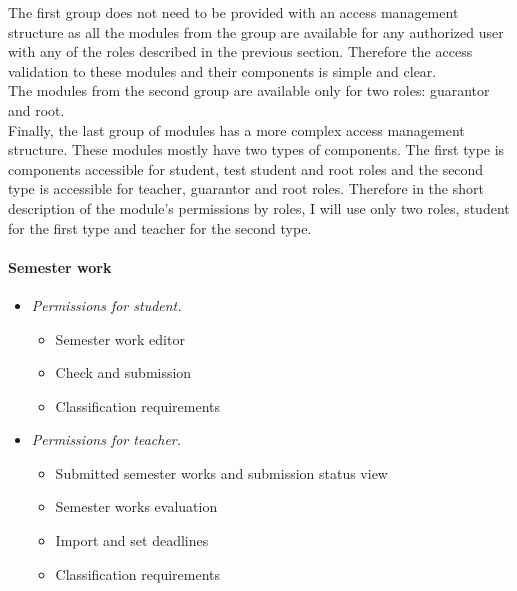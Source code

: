 \noindent The first group does not need to be provided with an access management structure as all the modules from the group are available for any authorized user with any of the roles described in the previous section. Therefore the access validation to these modules and their components is simple and clear.\\
The modules from the second group are available only for two roles: guarantor and root.\\
Finally, the last group of modules has a more complex access management structure. These modules mostly have two types of components. The first type is components accessible for student, test student and root roles and the second type is accessible for teacher, guarantor and root roles. Therefore in the short description of the module's permissions by roles, I will use only two roles, student for the first type and teacher for the second type.

\paragraph*{Semester work}
\begin{itemize}
    \item \emph{Permissions for student.} 
        \begin{itemize}
            \item Semester work editor
            \item Check and submission
            \item Classification requirements
        \end{itemize}
    \item \emph{Permissions for teacher.}
        \begin{itemize}
            \item Submitted semester works and submission status view
            \item Semester works evaluation
            \item Import and set deadlines
            \item Classification requirements
        \end{itemize}
\end{itemize}


